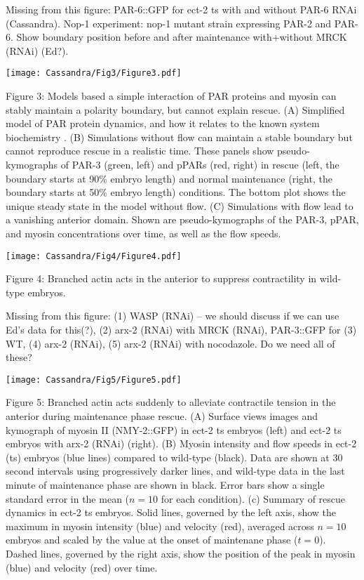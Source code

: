 \documentclass[11pt]{article}
\newcommand{\red}[1]{\color{red}#1\normalcolor}
\newcommand{\6}[1]{#1_{\text{6}}}
\newcommand{\3}[1]{#1_{\text{3}}}
\begin{document}
\red{Missing from this figure: PAR-6::GFP for ect-2 ts with and without PAR-6 RNAi (Cassandra). Nop-1 experiment: nop-1 mutant strain expressing PAR-2 and PAR-6. Show boundary position before and after maintenance with+without MRCK (RNAi) (Ed?).}


\newpage 
\begin{center}
\texttt{[image: Cassandra/Fig3/Figure3.pdf]}
\end{center}


\newpage
Figure 3: Models based a simple interaction of PAR proteins and myosin can stably maintain a polarity boundary, but cannot explain rescue. (A) Simplified model of PAR protein dynamics, and how it relates to the known system biochemistry \citep{lang2017proteins}. (B) Simulations without flow can maintain a stable boundary but cannot reproduce rescue in a realistic time. These panels show pseudo-kymographs of PAR-3 (green, left) and pPARs (red, right) in rescue (left, the boundary starts at 90\% embryo length) and normal maintenance (right, the boundary starts at 50\% embryo length) conditions. The bottom plot shows the unique steady state in the model without flow. (C) Simulations with flow lead to a vanishing anterior domain. Shown are pseudo-kymographs of the PAR-3, pPAR, and myosin concentrations over time, as well as the flow speeds.

\newpage 
\begin{center}
\texttt{[image: Cassandra/Fig4/Figure4.pdf]}
\end{center}

\newpage 
Figure 4: Branched actin acts in the anterior to suppress contractility in wild-type embryos. 

\red{Missing from this figure: (1) WASP (RNAi) -- we should discuss if we can use Ed's data for this(?), (2) arx-2 (RNAi) with MRCK (RNAi), PAR-3::GFP for (3) WT, (4) arx-2 (RNAi), (5) arx-2 (RNAi) with nocodazole. Do we need all of these?}

\newpage 
\begin{center}
\texttt{[image: Cassandra/Fig5/Figure5.pdf]}
\end{center}

\newpage 
Figure 5: Branched actin acts suddenly to alleviate contractile tension in the anterior during maintenance phase rescue. (A) Surface views images and kymograph of myosin II (NMY-2::GFP) in ect-2 ts embryos (left) and ect-2 ts embryos with arx-2 (RNAi) (right). (B) Myosin intensity and flow speeds in ect-2 (ts) embryos (blue lines) compared to wild-type (black). Data are shown at 30 second intervals using progressively darker lines, and wild-type data in the last minute of maintenance phase are shown in black. Error bars show a single standard error in the mean ($n=10$ for each condition). (c) Summary of rescue dynamics in ect-2 ts embryos. Solid lines, governed by the left axis, show the maximum in myosin intensity (blue) and velocity (red), averaged across $n=10$ embryos and scaled by the value at the onset of maintenane phase ($t=0$). Dashed lines, governed by the right axis, show the position of the peak in myosin (blue) and velocity (red) over time.
\end{document}
